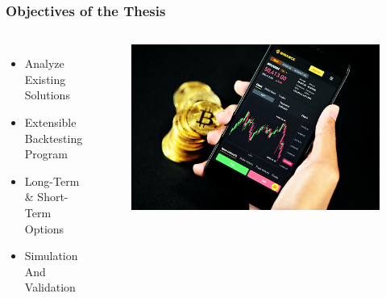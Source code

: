 




\begin{frame}
  \frametitle{Objectives of the Thesis}
  \begin{columns}
    \begin{itemize}
        \item Analyze Existing Solutions
        \item Extensible Backtesting Program
        \item Long-Term \& Short-Term Options
        \item Simulation And Validation
    \end{itemize}


    \begin{figure}
      \includegraphics[width=\textwidth]{img/bitcoin.jpg}
    \end{figure}
  \end{columns}
\end{frame}


